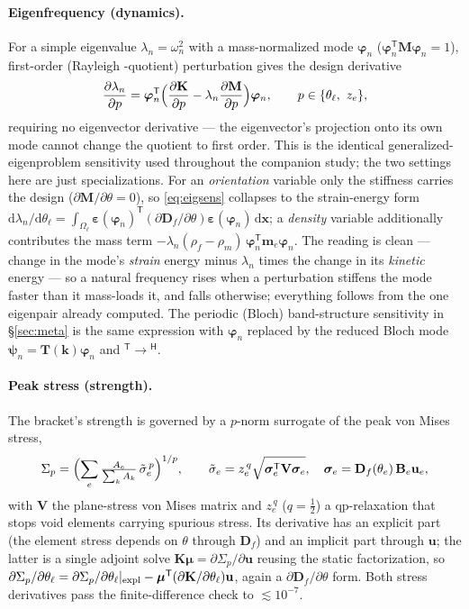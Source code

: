 \documentclass[preprint,11pt]{elsarticle}
\newcommand{\vu}{\mathbf{u}}
\newcommand{\vx}{\mathbf{x}}
\newcommand{\vphi}{\bm{\varphi}}
\newcommand{\veps}{\bm{\varepsilon}}
\newcommand{\Tp}{^{\mathsf{T}}}
\newcommand{\Hp}{^{\mathsf{H}}}
\newcommand{\rmd}{\mathrm{d}}
\newcommand{\Df}{\mathbf{D}_f}
\newcommand{\Kmat}{\mathbf{K}}
\newcommand{\Mmat}{\mathbf{M}}
\theoremstyle{plain}\newtheorem{proposition}{Proposition}
\theoremstyle{remark}\newtheorem{remark}{Remark}
\begin{document}
\paragraph{Eigenfrequency (dynamics).} For a simple eigenvalue $\lambda_n=\omega_n^2$
with a mass-normalized mode $\vphi_n$ ($\vphi_n\Tp\Mmat\vphi_n=1$), first-order (Rayleigh
-quotient) perturbation gives the design derivative
\begin{equation}
  \frac{\partial\lambda_n}{\partial p}=\vphi_n\Tp\Bigl(\frac{\partial\Kmat}{\partial p}
  -\lambda_n\frac{\partial\Mmat}{\partial p}\Bigr)\vphi_n,
  \qquad p\in\{\theta_\ell,\ z_e\},
  \label{eq:eigsens}
\end{equation}
requiring no eigenvector derivative --- the eigenvector's projection onto its own mode
cannot change the quotient to first order. This is the identical generalized-eigenproblem
sensitivity used throughout the companion study; the two settings here are just
specializations. For an \emph{orientation} variable only the stiffness carries the design
($\partial\Mmat/\partial\theta=0$), so \eqref{eq:eigsens} collapses to the strain-energy
form $\rmd\lambda_n/\rmd\theta_\ell=\int_{\Omega_\ell}\veps(\vphi_n)\Tp(\partial\Df/\partial
\theta)\veps(\vphi_n)\,\rmd\vx$; a \emph{density} variable additionally contributes the mass
term $-\lambda_n(\rho_f-\rho_m)\,\vphi_n\Tp\mathbf m_e\vphi_n$. The reading is clean ---
change in the mode's \emph{strain} energy minus $\lambda_n$ times the change in its
\emph{kinetic} energy --- so a natural frequency rises when a perturbation stiffens the mode
faster than it mass-loads it, and falls otherwise; everything follows from the one eigenpair
already computed. The periodic (Bloch) band-structure sensitivity in \S\ref{sec:meta} is the
same expression with $\vphi_n$ replaced by the reduced Bloch mode $\bm\psi_n=\mathbf T(\mathbf k)
\vphi_n$ and $\Tp\!\to\!{}\Hp$.

\paragraph{Peak stress (strength).} The bracket's strength is governed by a $p$-norm
surrogate of the peak von Mises stress,
\begin{equation}
  \Sigma_p=\Bigl(\sum_e\tfrac{A_e}{\sum_k A_k}\,\tilde\sigma_e^{\,p}\Bigr)^{1/p},\qquad
  \tilde\sigma_e=z_e^{\,q}\sqrt{\bm\sigma_e\Tp\mathbf V\bm\sigma_e},\quad
  \bm\sigma_e=\Df(\theta_e)\,\mathbf B_e\vu_e,
  \label{eq:pnorm}
\end{equation}
with $\mathbf V$ the plane-stress von Mises matrix and $z_e^{\,q}$ ($q=\tfrac12$) a
qp-relaxation that stops void elements carrying spurious stress. Its derivative has an
explicit part (the element stress depends on $\theta$ through $\Df$) and an implicit part
through $\vu$; the latter is a single adjoint solve $\Kmat\bm\mu=\partial\Sigma_p/\partial
\vu$ reusing the static factorization, so $\partial\Sigma_p/\partial\theta_\ell=
\partial\Sigma_p/\partial\theta_\ell|_{\rm expl}-\bm\mu\Tp(\partial\Kmat/\partial\theta_\ell)
\vu$, again a $\partial\Df/\partial\theta$ form. Both stress derivatives pass the
finite-difference check to $\lesssim10^{-7}$.
\end{document}
